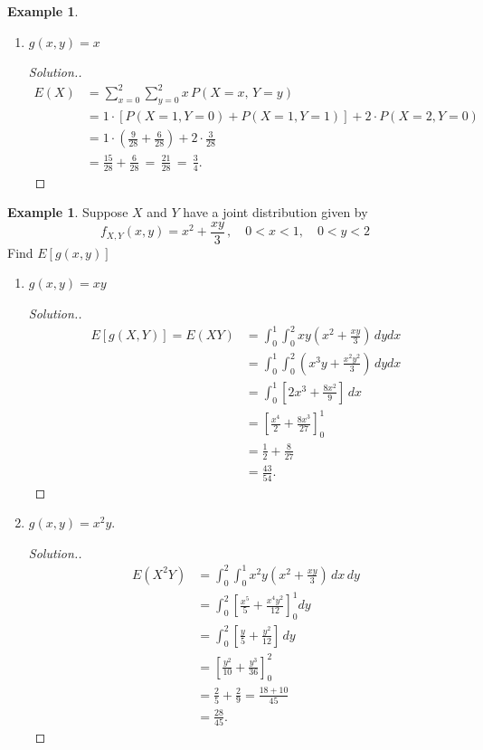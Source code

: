 \documentclass[12pt,a4paper]{report}
\theoremstyle{definition}
\newtheorem{example}[thm]{Example}
\theoremstyle{plain}
\theoremstyle{definition}
\begin{document}
\begin{example}
\begin{enumerate}
\item $g(x,y)=x$
\begin{proof}[\textit{Solution}.]
\begin{align*}
E(X) & = \sum^2_{x = 0}\sum^2_{y = 0} x\, P(X = x, \, Y = y)\\
& = 1\cdot[P(X = 1, Y = 0) + P(X = 1, Y = 1)] + 2\cdot P(X=2, Y=0)\\
& = 1\cdot\left(\frac{9}{28} + \frac{6}{28}\right)+2\cdot\frac{3}{28}\\
& = \frac{15}{28}+\frac{6}{28} \, = \, \frac{21}{28} \, = \, \frac{3}{4}.
\end{align*}
\end{proof}
\end{enumerate}      
\end{example}



\begin{example}
Suppose $X$ and $Y$  have a joint distribution given by \[f_{X,Y}(x,y)=x^2+\frac{xy}{3}\, ,\quad 0<x<1,\quad 0<y<2\]
Find $E[g(x,y)]$
\begin{enumerate}
\item $g(x,y)=xy$
\begin{proof}[\textit{Solution.}]
\begin{align*}
E[g(X,Y)]=E(XY) & = \int^1_0\int^2_0xy\left(x^2+\frac{xy}{3}\right)\,dydx\\
                        & = \int^1_0\int^2_0\left(x^3y+\frac{x^2y^2}{3}\right)\, dydx\\
                        & = \int^1_0\left[2x^3+\frac{8x^2}{9}\right]\,dx\\
                        & = \left[\frac{x^4}{2}+\frac{8x^3}{27}\right]^1_0\\
                        & = \frac{1}{2}+\frac{8}{27}\\
                        & = \frac{43}{54}.
\end{align*}
\end{proof}



\item $g(x,y)=x^2y$.
\begin{proof}[\textit{Solution}.]
\begin{align*}
E(X^2Y) & = \int^2_0\int^1_0x^2y\left(x^2+\frac{xy}{3}\right)\,dx\, dy\\
        & = \int^2_0\left[\frac{x^5}{5}+\frac{x^4y^2}{12}\right]^1_0dy\\
        & = \int^2_0\left[\frac{y}{5}+\frac{y^2}{12}\right]\, dy\\
        & = \left[\frac{y^2}{10}+\frac{y^3}{36}\right]^2_0\\
        & = \frac{2}{5}+\frac{2}{9}=\frac{18+10}{45}\\
        & = \frac{28}{45}.    
\end{align*}
\end{proof}
\end{enumerate}
\end{example}
\end{document}
